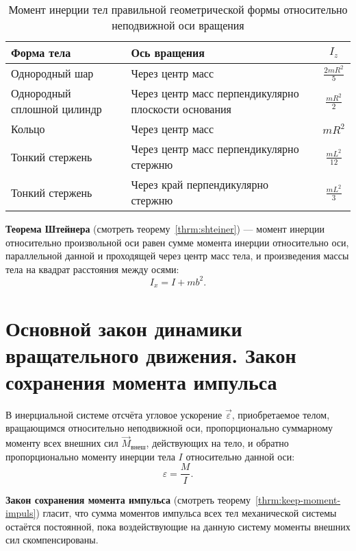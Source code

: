 \begin{table}[htpb]
  \centering
  \caption{Момент инерции тел правильной геометрической формы
  относительно неподвижной оси вращения}

  \begin{tabular}{p{} p{} c}
    \toprule
    Форма тела                  & Ось вращения
    & \( I_z \)               \\
    \midrule
    Однородный шар              & Через центр масс
    & \( \frac{2 m R^2}{5} \) \\
    Однородный сплошной цилиндр & Через центр масс перпендикулярно
    плоскости основания & \( \frac{m R^2}{2} \)   \\
    Кольцо                      & Через центр масс
    & \( m R^2 \)             \\
    Тонкий стержень             & Через центр масс перпендикулярно
    стержню             & \( \frac{m L^2}{12} \)  \\
    Тонкий стержень             & Через край перпендикулярно стержню
    & \( \frac{m L^2}{3} \)   \\
    \bottomrule
  \end{tabular}
\end{table}

\textbf{Теорема Штейнера} (смотреть теорему~\ref{thrm:shteiner}) — момент
инерции относительно произвольной оси равен сумме момента инерции относительно
оси, параллельной данной и проходящей через центр масс тела, и произведения
массы тела на квадрат расстояния между осями: \[
  I_x = I + mb^2
.\]

\section[восьмой вопрос]{Основной закон динамики вращательного движения. Закон
сохранения момента импульса}

\begin{theorem}
  В инерциальной системе отсчёта угловое ускорение $\vec{\varepsilon}$,
  приобретаемое телом, вращающимся относительно неподвижной оси,
  пропорционально суммарному моменту всех внешних сил $\vec{M}_\text{внеш}$,
  действующих на тело, и обратно пропорционально моменту инерции тела $I$
  относительно данной оси: \[
    \varepsilon = \frac{M}{I}
  .\]
\end{theorem}

\textbf{Закон сохранения момента импульса} (смотреть
теорему~\ref{thrm:keep-moment-impuls}) гласит, что сумма моментов импульса всех
тел механической системы остаётся постоянной, пока воздействующие на данную
систему моменты внешних сил скомпенсированы.

